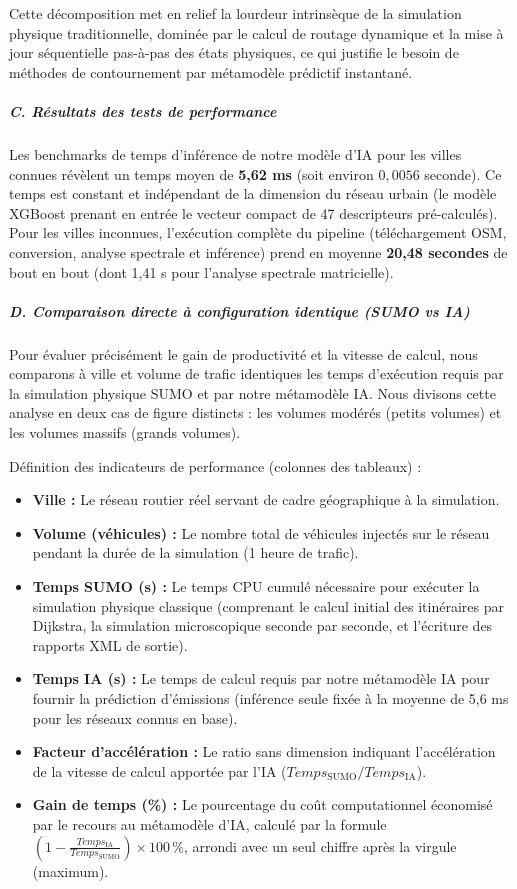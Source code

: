 \documentclass[10pt, a4paper]{article}
\providecommand{\tightlist}{}
\begin{document}
Cette décomposition met en relief la lourdeur intrinsèque de la
simulation physique traditionnelle, dominée par le calcul de routage
dynamique et la mise à jour séquentielle pas-à-pas des états physiques,
ce qui justifie le besoin de méthodes de contournement par métamodèle
prédictif instantané.

\subparagraph{C. Résultats des tests de
performance}\label{c.-ruxe9sultats-des-tests-de-performance}

Les benchmarks de temps d'inférence de notre modèle d'IA pour les villes
connues révèlent un temps moyen de \textbf{5,62 ms} (soit environ
\(0,0056\) seconde). Ce temps est constant et indépendant de la
dimension du réseau urbain (le modèle XGBoost prenant en entrée le
vecteur compact de 47 descripteurs pré-calculés). Pour les villes
inconnues, l'exécution complète du pipeline (téléchargement OSM,
conversion, analyse spectrale et inférence) prend en moyenne
\textbf{20,48 secondes} de bout en bout (dont 1,41 s pour l'analyse
spectrale matricielle).

\subparagraph{D. Comparaison directe à configuration identique (SUMO vs
IA)}\label{d.-comparaison-directe-uxe0-configuration-identique-sumo-vs-ia}

Pour évaluer précisément le gain de productivité et la vitesse de
calcul, nous comparons à ville et volume de trafic identiques les temps
d'exécution requis par la simulation physique SUMO et par notre
métamodèle IA. Nous divisons cette analyse en deux cas de figure
distincts : les volumes modérés (petits volumes) et les volumes massifs
(grands volumes).

Définition des indicateurs de performance (colonnes des tableaux) :

\begin{itemize}
\tightlist
\item
  \textbf{Ville :} Le réseau routier réel servant de cadre géographique
  à la simulation.
\item
  \textbf{Volume (véhicules) :} Le nombre total de véhicules injectés
  sur le réseau pendant la durée de la simulation (1 heure de trafic).
\item
  \textbf{Temps SUMO (s) :} Le temps CPU cumulé nécessaire pour exécuter
  la simulation physique classique (comprenant le calcul initial des
  itinéraires par Dijkstra, la simulation microscopique seconde par
  seconde, et l'écriture des rapports XML de sortie).
\item
  \textbf{Temps IA (s) :} Le temps de calcul requis par notre métamodèle
  IA pour fournir la prédiction d'émissions (inférence seule fixée à la
  moyenne de 5,6 ms pour les réseaux connus en base).
\item
  \textbf{Facteur d'accélération :} Le ratio sans dimension indiquant
  l'accélération de la vitesse de calcul apportée par l'IA
  (\(Temps_{\text{SUMO}} / Temps_{\text{IA}}\)).
\item
  \textbf{Gain de temps (\%) :} Le pourcentage du coût computationnel
  économisé par le recours au métamodèle d'IA, calculé par la formule
  \(\left(1 - \frac{Temps_{\text{IA}}}{Temps_{\text{SUMO}}}\right) \times 100\,\%\),
  arrondi avec un seul chiffre après la virgule (maximum).
\end{itemize}
\end{document}
